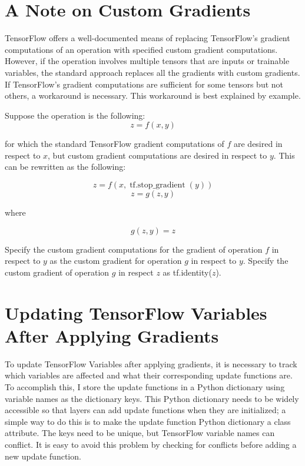 \section{A Note on Custom Gradients}
TensorFlow offers a well-documented means of replacing TensorFlow's gradient computations of an operation with specified custom gradient computations. However, if the operation involves multiple tensors that are inputs or trainable variables, the standard approach replaces all the gradients with custom gradients. If TensorFlow's gradient computations are sufficient for some tensors but not others, a workaround is necessary. This workaround is best explained by example.

Suppose the operation is the following:
\begin{equation}
z = f(x,y)
\end{equation}

for which the standard TensorFlow gradient computations of $f$ are desired in respect to $x$, but custom gradient computations are desired in respect to $y$. This can be rewritten as the following:

\begin{equation}
z = f(x,\operatorname{tf.stop\_gradient}(y))
\end{equation}
\begin{equation}
z = g(z,y)
\end{equation}

where

\begin{equation}
g(z,y) = z
\end{equation}

Specify the custom gradient computations for the gradient of operation $f$ in respect to $y$ as the custom gradient for operation $g$ in respect to $y$. Specify the custom gradient of operation $g$ in respect $z$ as tf.identity($z$). 

\section{Updating TensorFlow Variables After Applying Gradients}
To update TensorFlow Variables after applying gradients, it is necessary to track which variables are affected and what their corresponding update functions are. To accomplish this, I store the update functions in a Python dictionary using variable names as the dictionary keys. This Python dictionary needs to be widely accessible so that layers can add update functions when they are initialized; a simple way to do this is to make the update function Python dictionary a class attribute. The keys need to be unique, but TensorFlow variable names can conflict. It is easy to avoid this problem by checking for conflicts before adding a new update function.


